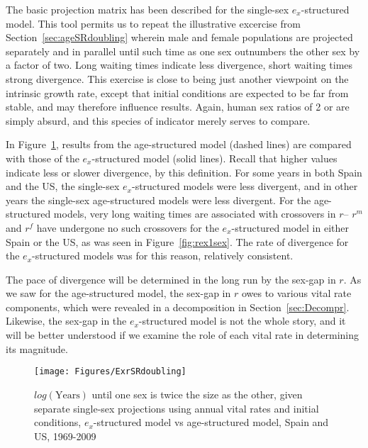  \FloatBarrier
The basic projection matrix has been described for the single-sex
$e_x$-structured model. This tool permits us to repeat the illustrative
excercise from Section~\ref{sec:ageSRdoubling} wherein male and female populations are
projected separately and in parallel until such time as one sex outnumbers the
other sex by a factor of two. Long waiting times indicate less divergence, short
waiting times strong divergence. This exercise is close to being just another
viewpoint on the intrinsic growth rate, except that initial conditions are
expected to be far from stable, and may therefore influence results. Again,
human sex ratios of 2 or \textonehalf are simply absurd, and this species of
indicator merely serves to compare.

In Figure~\ref{fig:exSRdoubling}, results from the age-structured model (dashed
lines) are compared with those of the $e_x$-structured model (solid lines).
Recall that higher values indicate less or slower divergence, by this
definition. For some years in both Spain and the US, the single-sex $e_x$-structured models were less
divergent, and in other years the single-sex age-structured models were less
divergent. For the age-structured models, very long waiting times are associated
with crossovers in $r$-- $r^m$ and $r^f$ have undergone no such crossovers for
the $e_x$-structured model in either Spain or the US, as was seen in
Figure~\ref{fig:rex1sex}. The rate of divergence for the $e_x$-structured models
was for this reason, relatively consistent. 

The pace of divergence will be determined in the long run by the sex-gap in $r$.
As we saw for the age-structured model, the sex-gap in $r$ owes to various vital
rate components, which were revealed in a decomposition in
Section~\ref{sec:Decompr}. Likewise, the sex-gap in the $e_x$-structured model
is not the whole story, and it will be better understood if we examine the role
of each vital rate in determining its magnitude.

\begin{figure}[ht!]
        \centering  
          \caption{$log(\mathrm{Years})$ until one sex is twice the size as the
          other, given separate single-sex projections using annual vital rates and initial
          conditions, $e_x$-structured model vs age-structured model, Spain
          and US, 1969-2009}
           \texttt{[image: Figures/ExrSRdoubling]}
          \label{fig:exSRdoubling}
\end{figure}


 \FloatBarrier